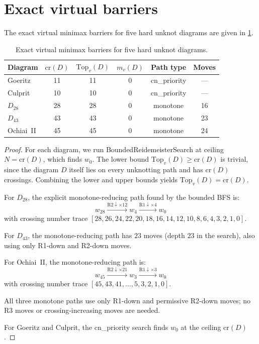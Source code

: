 \documentclass[a4paper,UKenglish,cleveref,autoref]{lipics-v2021}
\newcommand{\BRS}{\textsf{Bounded\-Reide\-meister\-Search}\xspace}
\begin{document}
\section{Exact virtual barriers}

\begin{theorem}\label{thm:virtual_barriers}
The exact virtual minimax barriers for five hard unknot diagrams are given in \cref{tab:barriers}.
\end{theorem}

\begin{table}
\caption{Exact virtual minimax barriers for five hard unknot diagrams.}
\label{tab:barriers}
\begin{center}
\begin{tabular}{lccccc}
\toprule
Diagram & $\mathrm{cr}(D)$ & $\mathrm{Top}_v(D)$ & $m_v(D)$ & Path type & Moves \\
\midrule
Goeritz & 11 & 11 & 0 & cn\_priority & --- \\
Culprit & 10 & 10 & 0 & cn\_priority & --- \\
$D_{28}$ & 28 & 28 & 0 & monotone & 16 \\
$D_{43}$ & 43 & 43 & 0 & monotone & 23 \\
Ochiai~II & 45 & 45 & 0 & monotone & 24 \\
\bottomrule
\end{tabular}
\end{center}
\end{table}

\begin{proof}
For each diagram, we run \BRS at ceiling $N = \mathrm{cr}(D)$, which finds $w_0$.
The lower bound $\mathrm{Top}_v(D) \geq \mathrm{cr}(D)$ is trivial, since the diagram $D$ itself lies on every unknotting path and has $\mathrm{cr}(D)$ crossings.
Combining the lower and upper bounds yields $\mathrm{Top}_v(D) = \mathrm{cr}(D)$.

For $D_{28}$, the explicit monotone-reducing path found by the bounded BFS is:
\[
w_{28} \xrightarrow{\text{R2}\downarrow \times 12} w_4 \xrightarrow{\text{R1}\downarrow \times 4} w_0
\]
with crossing number trace $[28, 26, 24, 22, 20, 18, 16, 14, 12, 10, 8, 6, 4, 3, 2, 1, 0]$.

For $D_{43}$, the monotone-reducing path has $23$ moves (depth $23$ in the search), also using only R1-down and R2-down moves.

For Ochiai~II, the monotone-reducing path is:
\[
w_{45} \xrightarrow{\text{R2}\downarrow \times 21} w_3 \xrightarrow{\text{R1}\downarrow \times 3} w_0
\]
with crossing number trace $[45, 43, 41, \ldots, 5, 3, 2, 1, 0]$.

All three monotone paths use only R1-down and permissive R2-down moves; no R3 moves or crossing-increasing moves are needed.

For Goeritz and Culprit, the cn\_priority search finds $w_0$ at the ceiling $\mathrm{cr}(D)$.
\end{proof}
\end{document}
